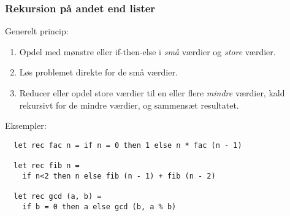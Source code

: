 \documentclass{beamer}
\begin{document}

\begin{frame}[fragile=singleslide]
\frametitle{Rekursion på andet end lister}

Generelt princip:

\begin{enumerate}[~1.]
\item Opdel med mønstre eller if-then-else i \emph{små} værdier og
  \emph{store} værdier.
\item Løs problemet direkte for de små værdier.
\item Reducer eller opdel store værdier til en eller flere
  \emph{mindre} værdier, kald rekursivt for de mindre værdier, og
  sammensæt resultatet.
\end{enumerate}

Eksempler:

\begin{verbatim}
  let rec fac n = if n = 0 then 1 else n * fac (n - 1)

  let rec fib n =
    if n<2 then n else fib (n - 1) + fib (n - 2)

  let rec gcd (a, b) =
    if b = 0 then a else gcd (b, a % b)
\end{verbatim}

\end{frame}
\end{document}
